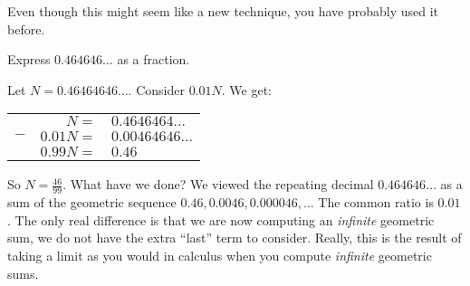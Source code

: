 \documentclass[11pt,]{book}
\theoremstyle{ptxplainnotitle}
\theoremstyle{ptxplaintitle}
\theoremstyle{ptxdefinitionnotitle}
\theoremstyle{ptxdefinitiontitle}
\theoremstyle{ptxdefinitionnotitle}
\theoremstyle{ptxdefinitiontitle}
\theoremstyle{ptxdefinitionnotitle}
\theoremstyle{ptxdefinitiontitle}
\theoremstyle{ptxdefinitiontitlenonumber}
\theoremstyle{ptxdefinitiontitlenonumber}
\numberwithin{equation}{chapter}
\newcommand{\hrulethin}  {\noalign{\hrule height 0.04em}}
\begin{document}
\hypertarget{p-212}{}%
Even though this might seem like a new technique, you have probably used it before.%
\begin{example}\label{example-12}
\hypertarget{p-213}{}%
Express \(0.464646\ldots\) as a fraction.%
\par\smallskip%
\noindent\textbf{}\hypertarget{solution-23}{}\hypertarget{p-214}{}%
Let \(N = 0.46464646\ldots\). Consider \(0.01N\). We get:%
\begin{sidebyside}{1}{0}{0}{0}
\begin{sbspanel}{1}
{\centering%
\begin{tabular}{lrl}
&\(N =\)&\(0.4646464\ldots\)\tabularnewline[0pt]
\(-\)&\(0.01N =\)&\(0.00464646\ldots\)\tabularnewline\hrulethin
&\(0.99N =\)&\(0.46\)
\end{tabular}
\par}
\end{sbspanel}
\end{sidebyside}
\par
\hypertarget{p-215}{}%
So \(N = \frac{46}{99}\). What have we done? We viewed the repeating decimal \(0.464646\ldots\) as a sum of the geometric sequence \(0.46, 0.0046, 0.000046, \ldots\) The common ratio is \(0.01\). The only real difference is that we are now computing an \emph{infinite} geometric sum, we do not have the extra ``last'' term to consider. Really, this is the result of taking a limit as you would in calculus when you compute \emph{infinite} geometric sums.%
\end{example}
\typeout{************************************************}
\typeout{************************************************}
\end{document}
